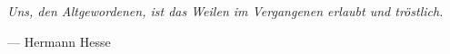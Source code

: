 \begin{center}
	\parbox{10cm}{
			\begin{centering}
				{\Large 
					\textit{Uns, den Altgewordenen, ist das Weilen im Vergangenen erlaubt und tröstlich.}
				}
				
				\normalsize\vspace{.5cm}\hfill{--- Hermann Hesse}
			\end{centering}
		}
\end{center}